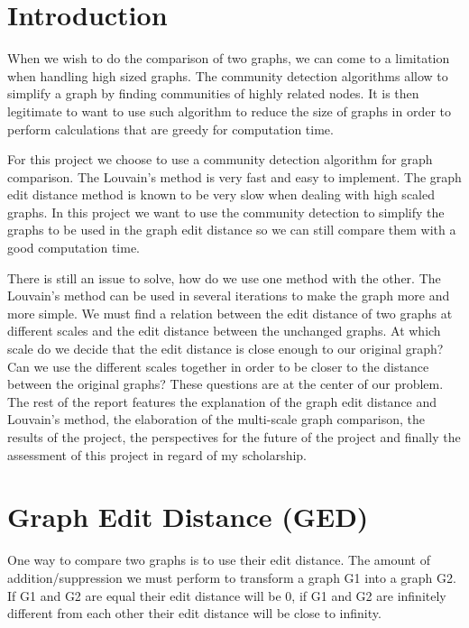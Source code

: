 \documentclass[UTF8, twoside]{EPURapport}
\begin{document}
\chapter{Introduction}

	\hspace{4ex}When we wish to do the comparison of two graphs, we can come to a limitation when handling high sized graphs. The community detection algorithms allow to simplify a graph by finding communities of highly related nodes. It is then legitimate to want to use such algorithm to reduce the size of graphs in order to perform calculations that are greedy for computation time.
	
	For this project we choose to use a community detection algorithm for graph comparison. The Louvain's method is very fast and easy to implement. The graph edit distance method is known to be very slow when dealing with high scaled graphs. In this project we want to use the community detection to simplify the graphs to be used in the graph edit distance so we can still compare them with a good computation time.
	
	There is still an issue to solve, how do we use one method with the other. The Louvain's method can be used in several iterations to make the graph more and more simple. We must find a relation between the edit distance of two graphs at different scales and the edit distance between the unchanged graphs. At which scale do we decide that the edit distance is close enough to our original graph? Can we use the different scales together in order to be closer to the distance between the original graphs? These questions are at the center of our problem.
\\

	The rest of the report features the explanation of the graph edit distance and Louvain's method, the elaboration of the multi-scale graph comparison, the results of the project, the perspectives for the future of the project and finally the assessment of this project in regard of my scholarship.
	
\chapter{Graph Edit Distance (GED)}
\label{GED}

	\hspace{4ex}One way to compare two graphs is to use their edit distance. The amount of addition/suppression we must perform to transform a graph G1 into a graph G2. If G1 and G2 are equal their edit distance will be 0, if G1 and G2 are infinitely different from each other their edit distance will be close to infinity.
	
\end{document}
